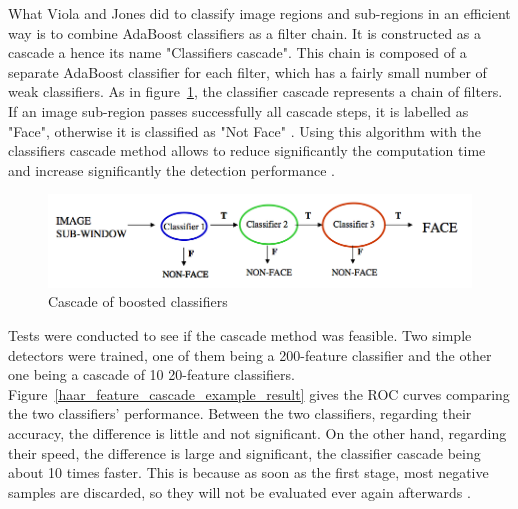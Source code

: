 \vspace{\baselineskip}
\noindent What Viola and Jones did to classify image regions and sub-regions in an efficient way is to combine AdaBoost classifiers as a filter chain. It is constructed as a cascade a hence its name  "Classifiers cascade". This chain is composed of a separate AdaBoost classifier for each filter, which has a fairly small number of weak classifiers. As in figure~\ref{haar_feature_cascade}, the classifier cascade represents a chain of filters. If an image sub-region passes successfully all cascade steps, it is labelled as "Face", otherwise it is classified as "Not Face" \cite{HEW07}. Using this algorithm with the classifiers cascade method allows to reduce significantly the computation time and increase significantly the detection performance \cite{VIO01}.
\newline

\begin{figure}[!h]
\begin{center}
\noindent \includegraphics[scale=0.5]{figures/haar_feature_cascade} 
\newline
\caption{Cascade of boosted classifiers}
\label{haar_feature_cascade}
\end{center} 
\end{figure}

\noindent Tests were conducted to see if the cascade method was feasible. Two simple detectors were trained, one of them being a 200-feature classifier and the other one being a cascade of 10 20-feature classifiers. Figure~\ref{haar_feature_cascade_example_result} gives the ROC curves comparing the two classifiers' performance. Between the two classifiers, regarding their accuracy, the difference is little and not significant. On the other hand, regarding their speed, the difference is large and significant, the classifier cascade being about 10 times faster. This is because as soon as the first stage, most negative samples are discarded, so they will not be evaluated ever again afterwards \cite{VIO01}.
\newline

